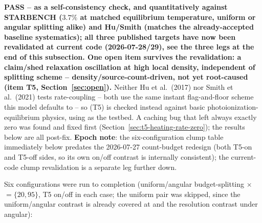 \textbf{PASS -- as a self-consistency check, and quantitatively against
STARBENCH ($3.7\%$ at matched equilibrium temperature, uniform or
angular splitting alike) and Hu/Smith (matches the already-accepted
baseline systematics); all three published targets have now been
revalidated at current code (2026-07-28/29), see the three legs at the
end of this subsection. \textbf{One open item survives the revalidation}:
a claim/shed relaxation oscillation at high local density, independent
of splitting scheme -- density/source-count-driven, not yet root-caused
(item T5, Section~\ref{sec:open}).}
Neither Hu et al.\ (2017)
nor Smith et al.\ (2021) tests rate-coupling -- both use the same
instant flag-and-floor scheme this model defaults to -- so
 (T5) is checked
instead against basic photoionization-equilibrium physics, using
 as the testbed. A caching bug that
left  always exactly zero was found and fixed
first (Section~\ref{sec:t5-heating-rate-zero}); the results below are
all post-fix. \textbf{Epoch note}: the six-configuration clump table
immediately below predates the 2026-07-27 count-budget redesign (both
T5-on and T5-off sides, so its own on/off contrast is internally
consistent); the current-code clump revalidation is a separate leg
further down.

Six configurations were run to completion (uniform/angular
budget-splitting $\times$ $=\{20,95\}$, T5 on/off in
each case; the uniform  pair was skipped, since the
uniform/angular contrast is already covered at  and
the resolution contrast under angular):

